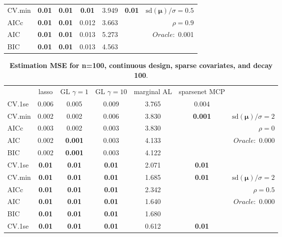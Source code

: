 \begin{table}
\begin{center}
\begin{tabular}{l*{5}{c}|r}
CV.min & {\bf 0.01} & {\bf 0.01} & {\bf 0.01} & 3.949 & {\bf 0.01} &  $\mathrm{sd}(\mathbf{\mu})/\sigma=0.5$ \\
AICc & {\bf 0.01} & {\bf 0.01} & 0.012 & 3.663 & & $\rho=0.9$ \\
AIC & {\bf 0.01} & {\bf 0.01} & 0.013 & 5.273 & &  \multirow{2}{*}{$Oracle: $ 0.001} \\
BIC & {\bf 0.01} & {\bf 0.01} & 0.013 & 4.563 & &  \\
 \hline 
\end{tabular}
\end{center}
\vspace{-1cm}
\end{table}




\clearpage
\begin{table}\vspace{-.5cm}
\caption[l]{ { \bf Estimation MSE for n=100, continuous design, 
sparse covariates, and  decay  100}.}
\vspace{-.5cm}
\footnotesize{}
\begin{center}
\begin{tabular}{l*{5}{c}|r}
& lasso & GL $\gamma=1$ & GL $\gamma=10$ & marginal AL & sparsenet MCP  & \\
 \cline{1-7}
CV.1se & 0.006 & 0.005 & 0.009 & 3.765 & 0.004 & \\
CV.min & 0.002 & 0.002 & 0.006 & 3.830 & {\bf 0.001} &  $\mathrm{sd}(\mathbf{\mu})/\sigma=2$ \\
AICc & 0.003 & 0.002 & 0.003 & 3.830 & & $\rho=0$ \\
AIC & 0.002 & {\bf 0.001} & 0.003 & 4.133 & &  \multirow{2}{*}{$Oracle: $ 0.000} \\
BIC & 0.002 & {\bf 0.001} & 0.003 & 4.122 & &  \\
 \hline 
CV.1se & {\bf 0.01} & {\bf 0.01} & {\bf 0.01} & 2.071 & {\bf 0.01} & \\
CV.min & {\bf 0.01} & {\bf 0.01} & {\bf 0.01} & 1.685 & {\bf 0.01} &  $\mathrm{sd}(\mathbf{\mu})/\sigma=2$ \\
AICc & {\bf 0.01} & {\bf 0.01} & {\bf 0.01} & 2.342 & & $\rho=0.5$ \\
AIC & {\bf 0.01} & {\bf 0.01} & {\bf 0.01} & 1.640 & &  \multirow{2}{*}{$Oracle: $ 0.000} \\
BIC & {\bf 0.01} & {\bf 0.01} & {\bf 0.01} & 1.680 & &  \\
 \hline 
CV.1se & {\bf 0.01} & {\bf 0.01} & {\bf 0.01} & 0.612 & {\bf 0.01} & \\

\end{tabular}
\end{center}
\end{table}

